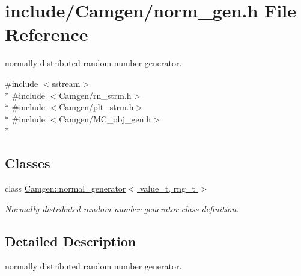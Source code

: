\hypertarget{a00679}{\section{include/\-Camgen/norm\-\_\-gen.h File Reference}
\label{a00679}
}


normally distributed random number generator.  


{\ttfamily \#include $<$sstream$>$}\\*
{\ttfamily \#include $<$Camgen/rn\-\_\-strm.\-h$>$}\\*
{\ttfamily \#include $<$Camgen/plt\-\_\-strm.\-h$>$}\\*
{\ttfamily \#include $<$Camgen/\-M\-C\-\_\-obj\-\_\-gen.\-h$>$}\\*
\subsection*{Classes}
\begin{DoxyCompactItemize}
\item 
class \hyperlink{a00381}{Camgen\-::normal\-\_\-generator$<$ value\-\_\-t, rng\-\_\-t $>$}
\begin{DoxyCompactList}\small\item\em Normally distributed random number generator class definition. \end{DoxyCompactList}\end{DoxyCompactItemize}


\subsection{Detailed Description}
normally distributed random number generator. 